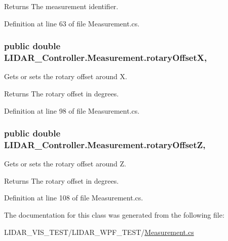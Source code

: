 \begin{DoxyReturn}{Returns}
The measurement identifier. 
\end{DoxyReturn}


Definition at line 63 of file Measurement.\+cs.

\subsubsection[{\texorpdfstring{rotary\+OffsetX}{rotaryOffsetX}}]{\setlength{\rightskip}{0pt plus 5cm}public double L\+I\+D\+A\+R\+\_\+\+Controller.\+Measurement.\+rotary\+OffsetX\hspace{0.3cm}{\ttfamily [get]}, {\ttfamily [set]}}\hypertarget{class_l_i_d_a_r___controller_1_1_measurement_a26ac087dbaf4f45ee4550cf5668ae4ff}{}\label{class_l_i_d_a_r___controller_1_1_measurement_a26ac087dbaf4f45ee4550cf5668ae4ff}


Gets or sets the rotary offset around X. 

\begin{DoxyReturn}{Returns}
The rotary offset in degrees. 
\end{DoxyReturn}


Definition at line 98 of file Measurement.\+cs.

\subsubsection[{\texorpdfstring{rotary\+OffsetZ}{rotaryOffsetZ}}]{\setlength{\rightskip}{0pt plus 5cm}public double L\+I\+D\+A\+R\+\_\+\+Controller.\+Measurement.\+rotary\+OffsetZ\hspace{0.3cm}{\ttfamily [get]}, {\ttfamily [set]}}\hypertarget{class_l_i_d_a_r___controller_1_1_measurement_aeb96de05257dd310531350f3af1eb47e}{}\label{class_l_i_d_a_r___controller_1_1_measurement_aeb96de05257dd310531350f3af1eb47e}


Gets or sets the rotary offset around Z. 

\begin{DoxyReturn}{Returns}
The rotary offset in degrees. 
\end{DoxyReturn}


Definition at line 108 of file Measurement.\+cs.



The documentation for this class was generated from the following file\+:\begin{DoxyCompactItemize}
\item 
L\+I\+D\+A\+R\+\_\+\+V\+I\+S\+\_\+\+T\+E\+S\+T/\+L\+I\+D\+A\+R\+\_\+\+W\+P\+F\+\_\+\+T\+E\+S\+T/\hyperlink{_measurement_8cs}{Measurement.\+cs}\end{DoxyCompactItemize}
